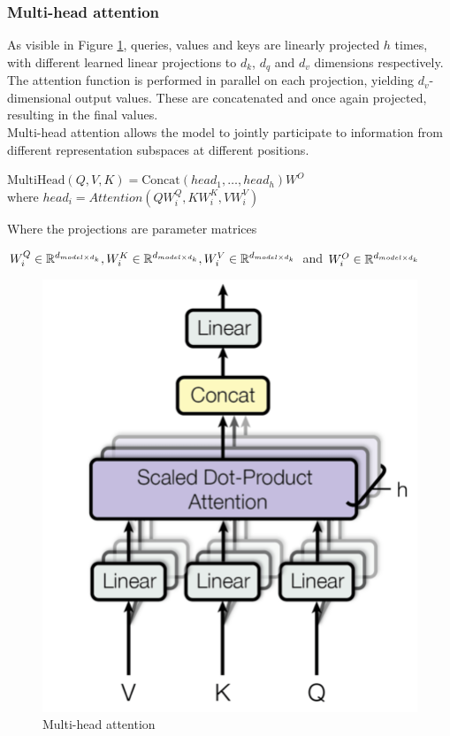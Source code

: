 \documentclass[\main/main.tex]{subfiles}
\begin{document}
\subsubsection{Multi-head attention}
As visible in Figure \ref{fig:multi-head_attention}, queries, values and keys are linearly projected $h$ times, with different learned linear projections to $d_k$, $d_q$ and $d_v$ dimensions respectively. The attention function is performed in parallel on each projection, yielding \mbox{$d_v$-dimensional} output values. These are concatenated and once again projected, resulting in the final values. \\
Multi-head attention allows the model to jointly participate to information from different representation subspaces at different positions. 
\begin{center}
    $\mathrm{MultiHead}(Q, V, K) =\mathrm{Concat}(head_1, \dots, head_h)W^O$\\
    where $head_i = Attention(QW^Q_i, KW^K_i, VW^V_i)$
\end{center}
Where the projections are parameter matrices 
\begin{center}
    $W^Q_i\in\mathbb{R}^{d_{model \times d_k}}, W^K_i\in\mathbb{R}^{d_{model \times d_k}}, W^V_i\in\mathbb{R}^{d_{model \times d_k}}$ and $ W^O_i\in\mathbb{R}^{d_{model \times d_k}}$
\end{center}

\begin{figure}[H]
    \centering
    \includegraphics[scale=0.25]{images/transformer/multi-headed_attention.jpeg}
    \caption{Multi-head attention}
    \label{fig:multi-head_attention}
\end{figure}
\end{document}

